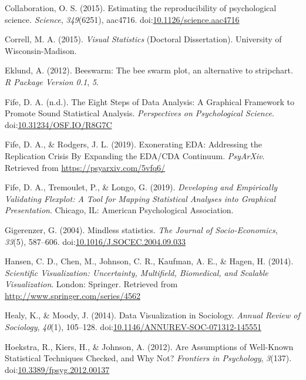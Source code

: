 \documentclass[
  doc]{apa6}
\begin{document}
\leavevmode\hypertarget{ref-open_science_collaboration_estimating_2015}{}%
Collaboration, O. S. (2015). Estimating the reproducibility of psychological science. \emph{Science}, \emph{349}(6251), aac4716. doi:\href{https://doi.org/10.1126/science.aac4716}{10.1126/science.aac4716}

\leavevmode\hypertarget{ref-Correll2015}{}%
Correll, M. A. (2015). \emph{Visual Statistics} (Doctoral Dissertation). University of Wisconsin-Madison.

\leavevmode\hypertarget{ref-eklund2012beeswarm}{}%
Eklund, A. (2012). Beeswarm: The bee swarm plot, an alternative to stripchart. \emph{R Package Version 0.1}, \emph{5}.

\leavevmode\hypertarget{ref-Fife2019e}{}%
Fife, D. A. (n.d.). The Eight Steps of Data Analysis: A Graphical Framework to Promote Sound Statistical Analysis. \emph{Perspectives on Psychological Science}. doi:\href{https://doi.org/10.31234/OSF.IO/R8G7C}{10.31234/OSF.IO/R8G7C}

\leavevmode\hypertarget{ref-Fife2019a}{}%
Fife, D. A., \& Rodgers, J. L. (2019). Exonerating EDA: Addressing the Replication Crisis By Expanding the EDA/CDA Continuum. \emph{PsyArXiv}. Retrieved from \url{https://psyarxiv.com/5vfq6/}

\leavevmode\hypertarget{ref-Fife2019d}{}%
Fife, D. A., Tremoulet, P., \& Longo, G. (2019). \emph{Developing and Empirically Validating Flexplot: A Tool for Mapping Statistical Analyses into Graphical Presentation}. Chicago, IL: American Psychological Association.

\leavevmode\hypertarget{ref-Gigerenzer2004}{}%
Gigerenzer, G. (2004). Mindless statistics. \emph{The Journal of Socio-Economics}, \emph{33}(5), 587--606. doi:\href{https://doi.org/10.1016/J.SOCEC.2004.09.033}{10.1016/J.SOCEC.2004.09.033}

\leavevmode\hypertarget{ref-Hansen}{}%
Hansen, C. D., Chen, M., Johnson, C. R., Kaufman, A. E., \& Hagen, H. (2014). \emph{Scientific Visualization: Uncertainty, Multifield, Biomedical, and Scalable Visualization}. London: Springer. Retrieved from \url{http://www.springer.com/series/4562}

\leavevmode\hypertarget{ref-Healy2014a}{}%
Healy, K., \& Moody, J. (2014). Data Visualization in Sociology. \emph{Annual Review of Sociology}, \emph{40}(1), 105--128. doi:\href{https://doi.org/10.1146/ANNUREV-SOC-071312-145551}{10.1146/ANNUREV-SOC-071312-145551}

\leavevmode\hypertarget{ref-hoekstra_are_2012}{}%
Hoekstra, R., Kiers, H., \& Johnson, A. (2012). Are Assumptions of Well-Known Statistical Techniques Checked, and Why Not? \emph{Frontiers in Psychology}, \emph{3}(137). doi:\href{https://doi.org/10.3389/fpsyg.2012.00137}{10.3389/fpsyg.2012.00137}
\end{document}
